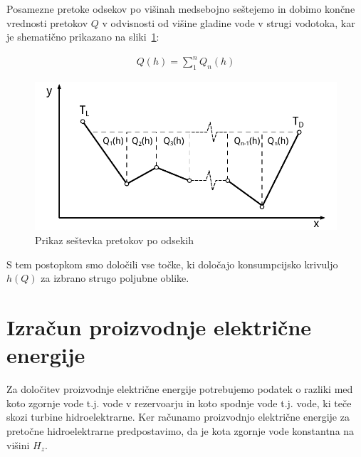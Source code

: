 Posamezne pretoke odsekov po višinah medsebojno seštejemo in dobimo končne vrednosti pretokov $Q$ v odvisnosti od višine gladine vode v strugi vodotoka, kar je shematično prikazano na sliki~\ref{fig:customChannel_sestevek}:

\begin{ceqn}
	\begin{align}
	Q(h) = \sum_{1}^{n} Q_n(h)
	\end{align}
\end{ceqn}


\begin{figure}[ht!]
	\begin{centering}
		\includegraphics{slike/customChannel/sestevekPretokov.pdf}
		\caption{Prikaz seštevka pretokov po odsekih}\label{fig:customChannel_sestevek}
	\end{centering}
\end{figure}



S tem postopkom smo določili vse točke, ki določajo konsumpcijsko krivuljo $h(Q)$ za izbrano strugo poljubne oblike.


\newpage

\section{Izračun proizvodnje električne energije}
Za določitev proizvodnje električne energije potrebujemo podatek o razliki med koto zgornje vode t.j. vode v rezervoarju in koto spodnje vode t.j. vode, ki teče skozi turbine hidroelektrarne. Ker računamo proizvodnjo električne energije za pretočne hidroelektrarne predpostavimo, da je kota zgornje vode konstantna na višini $H_z$.

